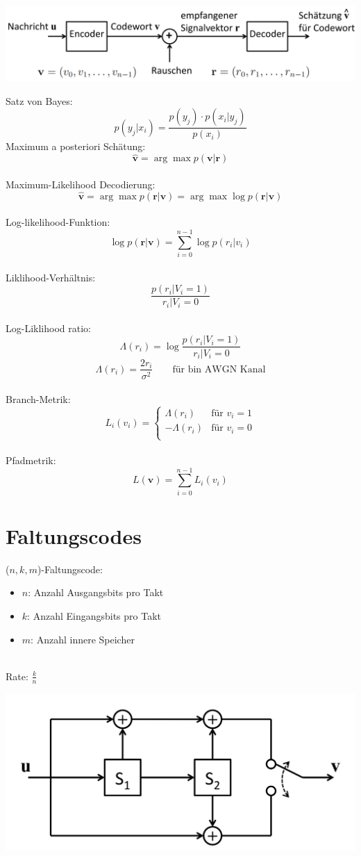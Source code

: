 \begin{center}
	\includegraphics[width=.9\textwidth]{./images/optdecode.png}
\end{center}
Satz von Bayes:
\[ p(y_j|x_i) = \frac{p(y_j) \cdot p(x_i|y_j)}{p(x_i)} \]
Maximum a posteriori Schätung:
\[ \hat{\textbf{v}} = \arg\max p(\textbf{v}|\textbf{r}) \]
~\\
Maximum-Likelihood Decodierung:
\[ \hat{\textbf{v}} = \arg\max p(\textbf{r}|\textbf{v}) =
	\arg\max\log p(\textbf{r}|\textbf{v}) \]
~\\
Log-likelihood-Funktion:
\[ \log p(\textbf{r}|\textbf{v}) = \sum_{i=0}^{n-1} \log p(r_i|v_i) \]
~\\
Liklihood-Verhältnis:
\[ \frac{p(r_i|V_i=1)}{r_i|V_i=0} \]
~\\
Log-Liklihood ratio:
\[ \Lambda(r_i) = \log\frac{p(r_i|V_i=1)}{r_i|V_i=0} \]
\[ \Lambda(r_i) = \frac{2r_i}{\sigma^2} \qquad \textrm{für bin AWGN Kanal}\]
~\\
Branch-Metrik:
\[ L_i(v_i) = \left\lbrace \begin{matrix}
		\Lambda(r_i)  & \textrm{für } v_i=1\\
		-\Lambda(r_i) & \textrm{für } v_i=0\\
	\end{matrix} \right. \]
~\\
Pfadmetrik:
\[ L(\textbf{v}) = \sum_{i=0}^{n-1}L_i(v_i) \]

\section{Faltungscodes}
($n,k,m$)-Faltungscode:
\begin{itemize}
	\item $n$: Anzahl Ausgangsbits pro Takt
	\item $k$: Anzahl Eingangsbits pro Takt
	\item $m$: Anzahl innere Speicher
\end{itemize}
~\\
Rate: $\frac{k}{n}$

\begin{center}
	\includegraphics[width=.9\textwidth]{./images/faltungscode.png}
\end{center}

